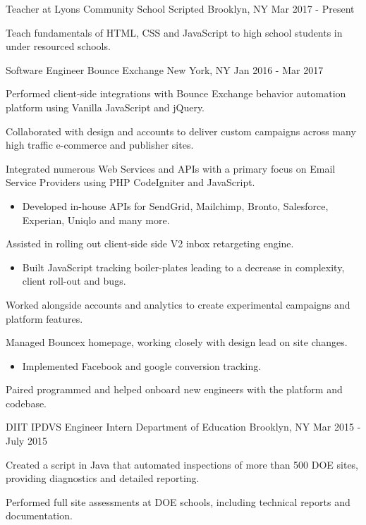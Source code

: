 \begin{cventries}
  \cventry
    {Teacher at Lyons Community School}
    {Scripted}
    {Brooklyn, NY}
    {Mar 2017 - Present}
    {
      \begin{cvitems}
        \item {Teach fundamentals of HTML, CSS and JavaScript to high school students in under resourced schools.}
      \end{cvitems}
    }
  \cventry
    {Software Engineer}
    {Bounce Exchange}
    {New York, NY}
    {Jan 2016 - Mar 2017}
    {
      \begin{cvitems}
        \item {Performed client-side integrations with Bounce Exchange behavior automation platform using Vanilla JavaScript and jQuery.}
        \item{Collaborated with design and accounts to deliver custom campaigns across many high traffic e-commerce and publisher sites.}
        \item{Integrated numerous Web Services and APIs with a primary focus on Email Service Providers using PHP CodeIgniter and JavaScript.}
        \begin{itemize}[leftmargin=5.5mm]
            \item[\bullet] {Developed in-house APIs for SendGrid, Mailchimp, Bronto, Salesforce, Experian, Uniqlo and many more.}
        \end{itemize}
        \item{Assisted in rolling out client-side side V2 inbox retargeting engine.}
        \begin{itemize}[leftmargin=5.5mm]
            \item[\bullet]{Built JavaScript tracking boiler-plates leading to a decrease in complexity, client roll-out and bugs.} 
        \end{itemize}
        \item{Worked alongside accounts and analytics to create experimental campaigns and platform features.}
        \item{Managed Bouncex homepage, working closely with design lead on site changes.}
        \begin{itemize}[leftmargin=5.5mm]
        \item[\bullet]{Implemented Facebook and google conversion tracking.}
        \end{itemize}
        \item{Paired programmed and helped onboard new engineers with the platform and codebase.}
      \end{cvitems}
    }
  \cventry
    {DIIT IPDVS Engineer Intern}
    {Department of Education }
    {Brooklyn, NY}
    {Mar 2015 - July 2015}
    {
      \begin{cvitems}
        \item {Created a script in Java that automated inspections of more than 500 DOE sites, providing diagnostics and detailed reporting.}
        \item{Performed full site assessments at DOE schools, including technical reports and documentation.}
      \end{cvitems}
    }
    \cventry
\end{cventries}
